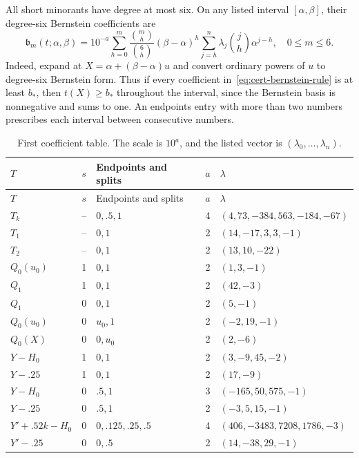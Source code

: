All short minorants have degree at most six.  On any listed interval
$[\alpha,\beta]$, their degree-six Bernstein coefficients are
\begin{equation}
 \mathfrak b_m(t;\alpha,\beta)=10^{-a}
 \sum_{h=0}^m\frac{\binom mh}{\binom6h}(\beta-\alpha)^h
       \sum_{j=h}^n\lambda_j\binom jh\alpha^{j-h},
       \quad 0\le m\le6.
 \label{eq:cert-bernstein-rule}
\end{equation}
Indeed, expand at $X=\alpha+(\beta-\alpha)u$ and convert ordinary
powers of $u$ to degree-six Bernstein form.  Thus if every coefficient
in~\eqref{eq:cert-bernstein-rule} is at least $b_*$, then
$t(X)\ge b_*$ throughout the interval, since the Bernstein basis is
nonnegative and sums to one.  An endpoints entry with more than two
numbers prescribes each interval between consecutive numbers.

\begingroup
\small
\setlength{\tabcolsep}{3pt}
\renewcommand{\arraystretch}{1.18}
\begin{longtable}{@{}lclc>{\raggedright\arraybackslash}p{}@{}}
\caption{First coefficient table.  The scale is $10^a$, and the
 listed vector is $(\lambda_0,\ldots,\lambda_n)$.}
\label{tab:cert-first}\\
\toprule
 $T$&$s$&Endpoints and splits&$a$&$\lambda$\\
\midrule
\endfirsthead
\toprule
 $T$&$s$&Endpoints and splits&$a$&$\lambda$\\
\midrule
\endhead
\bottomrule
\endfoot
 $T_k$&--&$0,.5,1$&4&$(4,73,-384,563,-184,-67)$\\
 $T_1$&--&$0,1$&2&$(14,-17,3,3,-1)$\\
 $T_2$&--&$0,1$&2&$(13,10,-22)$\\
 $Q_0(u_0)$&1&$0,1$&2&$(1,3,-1)$\\
 $Q_1$&1&$0,1$&2&$(42,-3)$\\
 $Q_1$&0&$0,1$&2&$(5,-1)$\\
 $Q_0(u_0)$&0&$u_0,1$&2&$(-2,19,-1)$\\
 $Q_0(X)$&0&$0,u_0$&2&$(2,-6)$\\
 $Y-H_0$&1&$0,1$&2&$(3,-9,45,-2)$\\
 $Y-.25$&1&$0,1$&2&$(17,-9)$\\
 $Y-H_0$&0&$.5,1$&3&$(-165,50,575,-1)$\\
 $Y-.25$&0&$.5,1$&2&$(-3,5,15,-1)$\\
 $Y'+.52k-H_0$&0&$0,.125,.25,.5$&4&$(406,-3483,7208,1786,-3)$\\
 $Y'-.25$&0&$0,.5$&2&$(14,-38,29,-1)$\\
\end{longtable}
\endgroup

